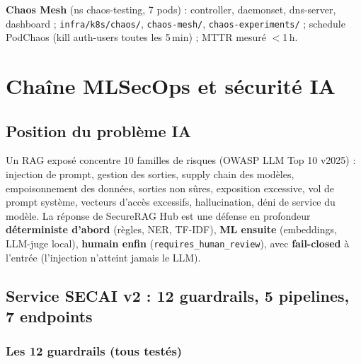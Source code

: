 \documentclass[12pt,a4paper,openany]{report}
\begin{document}
\textbf{Chaos Mesh} (ns chaos-testing, 7 pods) : controller, daemonset, dns-server, dashboard ;
\texttt{infra/k8s/chaos/}, \texttt{chaos-mesh/}, \texttt{chaos-experiments/} ;
schedule PodChaos (kill auth-users toutes les 5\,min) ; MTTR mesuré $<$1\,h.

\chapter{Chaîne MLSecOps et sécurité IA}
\label{ch:mlsecops}

\section{Position du problème IA}

Un RAG exposé concentre 10 familles de risques (OWASP LLM Top 10 v2025) :
injection de prompt, gestion des sorties, supply chain des modèles, empoisonnement des données,
sorties non sûres, exposition excessive, vol de prompt système, vecteurs d'accès excessifs,
hallucination, déni de service du modèle.
La réponse de SecureRAG Hub est une défense en profondeur \textbf{déterministe d'abord}
(règles, NER, TF-IDF), \textbf{ML ensuite} (embeddings, LLM-juge local), \textbf{humain enfin}
(\texttt{requires\_human\_review}), avec \textbf{fail-closed} à l'entrée
(l'injection n'atteint jamais le LLM).

\section{Service SECAI v2 : 12 guardrails, 5 pipelines, 7 endpoints}

\subsection{Les 12 guardrails (tous testés)}
\end{document}
